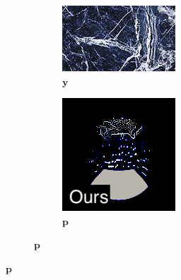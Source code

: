\begin{figure}[]
\begin{subfigure}{\textwidth}
        \begin{subfigure}{0.19\textwidth}
            \centering
            \includegraphics[width=\textwidth]{images/04-experiment03/ball_marble_target.jpg}
            \caption*{\(\bm{y}\)}
        \end{subfigure}
        \hfill
        \begin{subfigure}{0.19\textwidth}
            \centering
            \includegraphics[width=\textwidth]{images/04-experiment03/ball_dof/marble/stats_im_label.jpg}
            \caption*{\(\bm{p}\)}

\end{subfigure}
\end{subfigure}
\end{figure}
